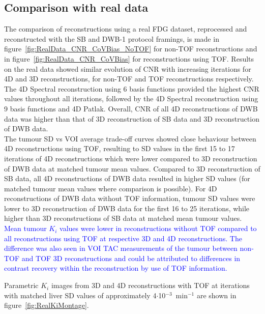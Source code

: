 \subsection*{Comparison with real data}
The comparison of reconstructions using a real FDG dataset, reprocessed and reconstructed with the SB and DWB-1 protocol framings, is made in figure~\ref{fig:RealData_CNR_CoVBias_NoTOF} for non-TOF reconstructions and in figure~\ref{fig:RealData_CNR_CoVBias} for reconstructions using TOF. %
Results on the real data showed similar evolution of CNR with increasing iterations for 4D and 3D reconstructions, for non-TOF and TOF reconstructions respectively.
The 4D Spectral reconstruction using 6 basis functions provided the highest CNR values throughout all iterations, followed by the 4D Spectral reconstruction using 9 basis functions and 4D Patlak. Overall, CNR of all 4D reconstructions of DWB data was higher than that of 3D reconstruction of SB data and 3D reconstruction of DWB data.\\
The tumour SD vs VOI average trade-off curves showed close behaviour between 4D reconstructions using TOF, resulting to SD values in the first 15 to 17 iterations of 4D reconstructions which were lower compared to 3D reconstruction of DWB data at matched tumour mean values. Compared to 3D reconstruction of SB data, all 4D reconstructions of DWB data resulted in higher SD values (for matched tumour mean values where comparison is possible).
For 4D reconstructions of DWB data without TOF information, tumour SD values were lower to 3D reconstruction of DWB data for the first 16 to 25 iterations, while higher than 3D reconstructions of SB data at matched mean tumour values. 
\textcolor{blue}{Mean tumour $K_i$ values were lower in reconstructions without TOF compared to all reconstructions using TOF at respective 3D and 4D reconstructions. The difference was also seen in VOI TAC measurements of the tumour between non-TOF and TOF 3D reconstructions and could be attributed to differences in contrast recovery within the reconstruction by use of TOF information.}

Parametric $K_i$ images from 3D and 4D reconstructions with TOF at iterations with matched liver SD values of approximately 4$\cdot$10$^{-3}$~min$^{-1}$ are shown in figure~\ref{fig:RealKiMontage}.

